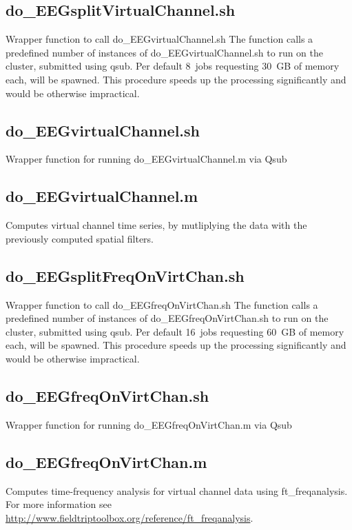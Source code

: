 \documentclass[12pt,a4paper]{scrartcl}
\begin{document}
\subsection{do\_EEGsplitVirtualChannel.sh}
\label{sec:virtch}
Wrapper function to call do\_EEGvirtualChannel.sh The function calls a predefined number of instances of do\_EEGvirtualChannel.sh to run on the cluster, submitted using qsub. Per default 8~jobs requesting 30~GB of memory each, will be spawned. This procedure speeds up the processing significantly and would be otherwise impractical.\\

\subsection{do\_EEGvirtualChannel.sh}
Wrapper function for running do\_EEGvirtualChannel.m via Qsub

\subsection{do\_EEGvirtualChannel.m}
Computes virtual channel time series, by mutliplying the data with the previously computed spatial filters.

\subsection{do\_EEGsplitFreqOnVirtChan.sh}
\label{sec:freqVirt}
Wrapper function to call do\_EEGfreqOnVirtChan.sh The function calls a predefined number of instances of do\_EEGfreqOnVirtChan.sh to run on the cluster, submitted using qsub. Per default 16~jobs requesting 60~GB of memory each, will be spawned. This procedure speeds up the processing significantly and would be otherwise impractical.\\

\subsection{do\_EEGfreqOnVirtChan.sh}
Wrapper function for running do\_EEGfreqOnVirtChan.m via Qsub

\subsection{do\_EEGfreqOnVirtChan.m}
Computes time-frequency analysis for virtual channel data using ft\_freqanalysis. For more information see \href{http://www.fieldtriptoolbox.org/reference/ft\_freqanalysis}{http://www.fieldtriptoolbox.org/reference/ft\_freqanalysis}.
\end{document}

